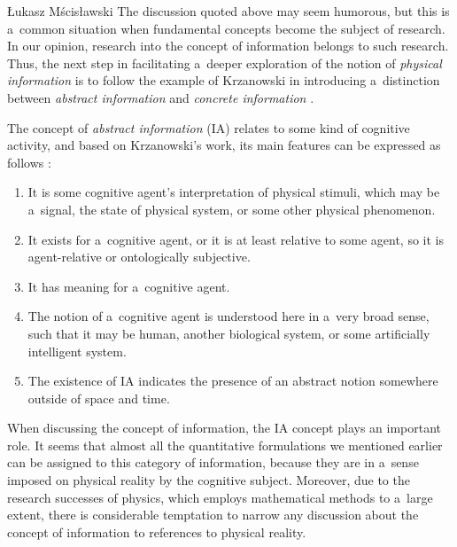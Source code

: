 \begin{artengenv}{Łukasz Mścisławski}
The discussion quoted above may seem humorous, but this is a~common situation when fundamental concepts become the subject of research. In our opinion, research into the concept of information belongs to such research. Thus, the next step in facilitating a~deeper exploration of the notion of \textit{physical information} is to follow the example of Krzanowski in introducing a~distinction between \textit{abstract information} and \textit{concrete information}
\parencite[cf.][p.2]{krzanowski_what_2020}.%


The concept of \textit{abstract information} (IA) relates to some kind of cognitive activity, and based on Krzanowski's work, its main features can be expressed as follows
\parencite[cf.][]{krzanowski_what_2020}: %
\begin{enumerate}[label=(IA\arabic*)]
\item It is some cognitive agent's interpretation of physical stimuli, which may be a~signal, the state of physical system, or some other physical phenomenon.
\item It exists for a~cognitive agent, or it is at least relative to some agent, so it is agent-relative or ontologically subjective.
\item It has meaning for a~cognitive agent.
\item The notion of a~cognitive agent is understood here in a~very broad sense, such that it may be human, another biological system, or some artificially intelligent system.
\item The existence of IA indicates the presence of an abstract notion somewhere outside of space and time.
\end{enumerate}

When discussing the concept of information, the IA concept plays an important role. It seems that almost all the quantitative formulations we mentioned earlier can be assigned to this category of information, because they are in a~sense imposed on physical reality by the cognitive subject. Moreover, due to the research successes of physics, which employs mathematical methods to a~large extent, there is considerable temptation to narrow any discussion about the concept of information to references to physical reality.


\end{artengenv}
